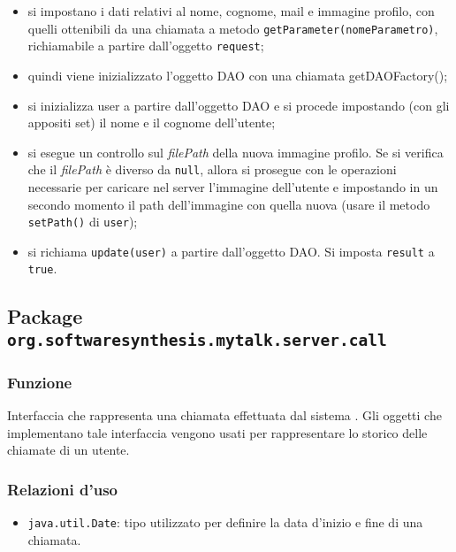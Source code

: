 \begin{description}
\begin{itemize}
	\item si impostano i dati relativi al nome, cognome, mail e immagine profilo, con quelli ottenibili da una chiamata a metodo \texttt{getParameter(nomeParametro)}, richiamabile a partire dall'oggetto \texttt{request};
	\item quindi viene inizializzato l'oggetto DAO con una chiamata getDAOFactory();
	\item si inizializza user a partire dall'oggetto DAO e si procede impostando (con gli appositi set) il nome e il cognome dell'utente;
	\item si esegue un controllo sul \textit{filePath} della nuova immagine profilo. Se si verifica che il \textit{filePath} è diverso da \texttt{null}, allora si prosegue con le operazioni necessarie per caricare nel server l'immagine dell'utente e impostando in un secondo momento il path dell'immagine con quella nuova (usare il metodo \texttt{setPath()} di \texttt{user});
	\item si richiama \texttt{update(user)} a partire dall'oggetto DAO. Si imposta \texttt{result} a \texttt{true}.
\end{itemize}
	
\end{description}


\subsection{Package \texttt{org.softwaresynthesis.mytalk.server.call}}\label{sec:call}


\subsubsection*{Funzione}
Interfaccia che rappresenta una chiamata effettuata dal sistema \caName. Gli oggetti che implementano tale interfaccia vengono usati per rappresentare lo storico delle chiamate di un utente.

\subsubsection*{Relazioni d'uso}
\begin{itemize}
	\item \texttt{java.util.Date}: tipo utilizzato per definire la data d'inizio e fine di una chiamata.
\end{itemize}


